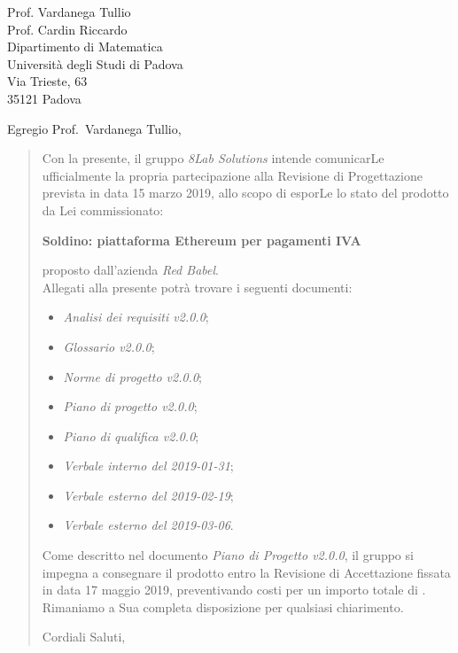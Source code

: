
\begin{letter}{
		Prof. Vardanega Tullio \\
		Prof. Cardin Riccardo \\
		Dipartimento di Matematica \\
		Università degli Studi di Padova \\
		Via Trieste, 63 \\
		35121 Padova}
		
\opening{Egregio Prof.~Vardanega Tullio,}

\begin{quotation}
Con la presente, il gruppo \textit{8Lab Solutions} intende 
comunicarLe ufficialmente la propria partecipazione alla Revisione di 
Progettazione prevista in data 15 marzo 2019, allo scopo di 
esporLe lo stato del prodotto da Lei commissionato:

\begin{center}
	\textbf{Soldino: piattaforma Ethereum per pagamenti IVA}
\end{center}

\noindent proposto dall'azienda \textit{Red Babel}. \\
Allegati alla presente potrà trovare i seguenti documenti:

\begin{itemize}
	\item \textit{Analisi dei requisiti v2.0.0};
	
	\item \textit{Glossario v2.0.0};
	
	\item \textit{Norme di progetto v2.0.0};

	\item \textit{Piano di progetto v2.0.0};

	\item \textit{Piano di qualifica v2.0.0};

	\item \textit{Verbale interno del 2019-01-31};
	
	\item \textit{Verbale esterno del 2019-02-19};
	\item \textit{Verbale esterno del 2019-03-06}.
\end{itemize}

\noindent Come descritto nel documento \textit{Piano di Progetto v2.0.0}, il 
gruppo si impegna a consegnare il prodotto entro la Revisione di Accettazione 
fissata in data 17 maggio 2019, preventivando costi per un importo 
totale di \textbf{}.\\
Rimaniamo a Sua completa disposizione per qualsiasi chiarimento.

\vspace{0.15cm}
\closing{ Cordiali Saluti,}
	

\end{quotation}
		
\end{letter}

